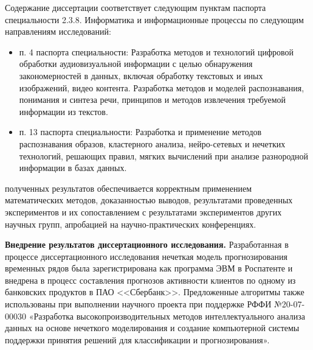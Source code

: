 {\specialityRelation} Содержание диссертации соответствует следующим пунктам паспорта специальности 2.3.8. Информатика и информационные процессы по следующим направлениям исследований:
\begin{itemize}
	\item п. 4 паспорта специальности: Разработка методов и технологий цифровой обработки аудиовизуальной информации с целью обнаружения закономерностей в данных, включая обработку текстовых и иных изображений, видео контента. Разработка методов и моделей распознавания, понимания и синтеза речи, принципов и методов извлечения требуемой информации из текстов.
	\item п. 13 паспорта специальности: Разработка и применение методов распознавания образов, кластерного анализа, нейро-сетевых и нечетких технологий, решающих правил, мягких вычислений при анализе разнородной информации в базах данных.
\end{itemize}

{\reliability} полученных результатов обеспечивается корректным применением математических методов, доказанностью выводов, результатами проведенных экспериментов и их сопоставлением с результатами экспериментов других научных групп, апробацией на научно-практических конференциях.

\textbf{Внедрение результатов диссертационного исследования.} Разработанная в процессе диссертационного исследования нечеткая модель прогнозирования временных рядов была зарегистрирована как программа ЭВМ в Роспатенте и внедрена в процесс составления прогнозов активности клиентов по одному из банковских продуктов в ПАО <<Сбербанк>>. Предложенные алгоритмы также использованы при выполнении научного проек­та при поддержке РФФИ №20-07-00030 «Разработка высокопроизводительных методов интеллектуального анализа данных на основе нечеткого моделиро­вания и создание компьютерной системы поддержки принятия решений для классификации и прогнозирования».

